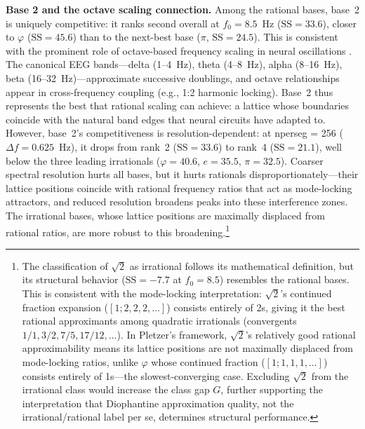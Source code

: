 \documentclass[11pt,a4paper]{article}
\newcommand{\phisym}{\varphi}
\newcommand{\fzero}{f_0}
\begin{document}
\textbf{Base 2 and the octave scaling connection.} Among the rational bases, base~2 is uniquely competitive: it ranks second overall at $\fzero = 8.5$~Hz ($\text{SS} = 33.6$), closer to $\phisym$ ($\text{SS} = 45.6$) than to the next-best base ($\pi$, $\text{SS} = 24.5$). This is consistent with the prominent role of octave-based frequency scaling in neural oscillations \parencite{buzsaki2004neuronal}. The canonical EEG bands---delta (1--4~Hz), theta (4--8~Hz), alpha (8--16~Hz), beta (16--32~Hz)---approximate successive doublings, and octave relationships appear in cross-frequency coupling (e.g., 1:2 harmonic locking). Base~2 thus represents the best that rational scaling can achieve: a lattice whose boundaries coincide with the natural band edges that neural circuits have adapted to. However, base~2's competitiveness is resolution-dependent: at nperseg = 256 ($\Delta f = 0.625$~Hz), it drops from rank~2 ($\text{SS} = 33.6$) to rank~4 ($\text{SS} = 21.1$), well below the three leading irrationals ($\phisym = 40.6$, $e = 35.5$, $\pi = 32.5$). Coarser spectral resolution hurts all bases, but it hurts rationals disproportionately---their lattice positions coincide with rational frequency ratios that act as mode-locking attractors, and reduced resolution broadens peaks into these interference zones. The irrational bases, whose lattice positions are maximally displaced from rational ratios, are more robust to this broadening.\footnote{The classification of $\sqrt{2}$ as irrational follows its mathematical definition, but its structural behavior ($\text{SS} = -7.7$ at $\fzero = 8.5$) resembles the rational bases. This is consistent with the mode-locking interpretation: $\sqrt{2}$'s continued fraction expansion ($[1; 2, 2, 2, \ldots]$) consists entirely of 2s, giving it the best rational approximants among quadratic irrationals (convergents $1/1, 3/2, 7/5, 17/12, \ldots$). In Pletzer's framework, $\sqrt{2}$'s relatively good rational approximability means its lattice positions are not maximally displaced from mode-locking ratios, unlike $\phisym$ whose continued fraction ($[1; 1, 1, 1, \ldots]$) consists entirely of 1s---the slowest-converging case. Excluding $\sqrt{2}$ from the irrational class would increase the class gap $G$, further supporting the interpretation that Diophantine approximation quality, not the irrational/rational label per se, determines structural performance.}
\end{document}
